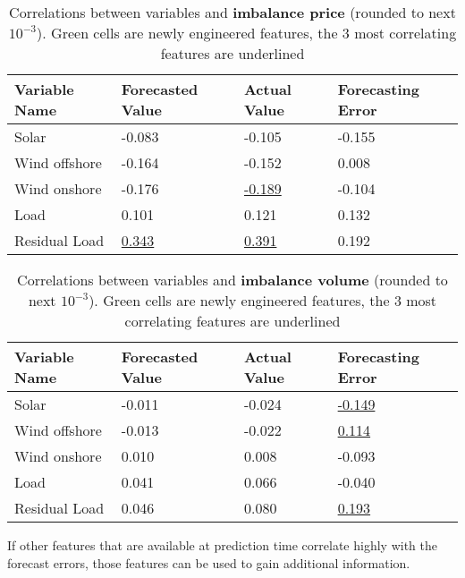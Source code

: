 \documentclass[class=scrbook, crop=false]{standalone}
\begin{document}
    \begin{table}[h]
    \centering
    \begin{tabular}{l|l|l|l}
    Variable Name	&Forecasted Value& Actual Value	& Forecasting Error \\\hline
    Solar 		& -0.083		& -0.105		& \cellcolor{green} -0.155 \\
    Wind offshore 	& -0.164		& -0.152		& \cellcolor{green} 0.008 \\
    Wind onshore 	& -0.176		& \underline{-0.189}	& \cellcolor{green} -0.104 \\
    Load 		&0.101		& 0.121		& \cellcolor{green}  0.132 \\
    Residual Load 	& \cellcolor{green} \underline{0.343}& \cellcolor{green} \underline{0.391}& \cellcolor{green}0.192\\
    \end{tabular}

    
    \caption{Correlations between variables and \textbf{imbalance price} (rounded to next $10^{-3}$). Green cells are newly engineered features, the 3 most correlating features are underlined}
    \label{Table::Rebap_Correlations_ENTSOE}
    \end{table}

    \begin{table}[h]
    \centering
    \begin{tabular}{l|l|l|l}
    Variable Name	&Forecasted Value& Actual Value	& Forecasting Error \\\hline
    Solar 		&  -0.011		& -0.024		& \cellcolor{green} \underline{-0.149} \\
    Wind offshore 	& -0.013		&  -0.022		& \cellcolor{green}\underline{0.114}\\
    Wind onshore 	& 0.010		& 0.008		& \cellcolor{green} -0.093\\
    Load 		& 0.041		& 0.066		& \cellcolor{green}  -0.040 \\
    Residual Load 	& \cellcolor{green} 0.046& \cellcolor{green} 0.080& \cellcolor{green} \underline{0.193}\\
    \end{tabular}

    
    \caption{Correlations between variables and \textbf{imbalance volume} (rounded to next $10^{-3}$). Green cells are newly engineered features, the 3 most correlating features are underlined}
    \label{Table::Imbalance_volume_Correlations_ENTSOE}
    \end{table}

If other features that are available at prediction time correlate highly with the forecast errors, those features can be used to gain additional information.
\end{document}

